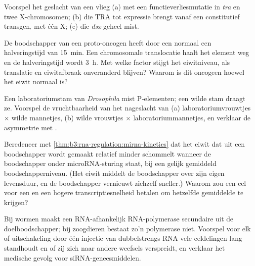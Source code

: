 \begin{exercise}[$\star\star$]\label{exo:b3:rna-regulation:7}
Voorspel het geslacht van een vlieg (a) met een functieverliesmutatie
in \emph{tra} en twee X-chromosomen; (b) die TRA tot expressie brengt
vanaf een constitutief transgen, met één X; (c) die \emph{dsx} geheel
mist.
\end{exercise}

\begin{exercise}[$\star\star$]\label{exo:b3:rna-regulation:8}
De boodschapper van een proto-oncogen heeft door een 
normaal een halveringstijd van \qty{15}{min}. Een chromosomale
translocatie haalt het element weg en de halveringstijd wordt
\qty{3}{h}. Met welke factor stijgt het eiwitniveau, als translatie en
eiwitafbraak onveranderd blijven? Waarom is dit oncogeen hoewel het
eiwit normaal is?
\end{exercise}

\begin{exercise}[$\star\star$]\label{exo:b3:rna-regulation:9}
Een laboratoriumstam van \emph{Drosophila} mist P-elementen; een wilde
stam draagt ze. Voorspel de vruchtbaarheid van het nageslacht van
(a) laboratoriumvrouwtjes $\times$ wilde mannetjes, (b) wilde
vrouwtjes $\times$ laboratoriummannetjes, en verklaar de asymmetrie
met .
\end{exercise}

\begin{exercise}[$\star\star\star$]\label{exo:b3:rna-regulation:10}
Beredeneer met \cref{thm:b3:rna-regulation:mirna-kinetics} dat het
eiwit dat uit een boodschapper wordt gemaakt relatief minder schommelt
wanneer de boodschapper onder microRNA-sturing staat, bij een gelijk
gemiddeld boodschapperniveau. (Het eiwit middelt de boodschapper over
zijn eigen levensduur, en de boodschapper vernieuwt zichzelf sneller.)
Waarom zou een cel voor een  en een hogere transcriptiesnelheid
betalen om hetzelfde gemiddelde te krijgen?
\end{exercise}

\begin{exercise}[$\star\star\star$]\label{exo:b3:rna-regulation:11}
Bij wormen maakt een RNA-afhankelijk RNA-polymerase secundaire 
uit de doelboodschapper; bij zoogdieren bestaat zo'n polymerase niet.
Voorspel voor elk of uitschakeling door één injectie van dubbelstrengs
RNA vele celdelingen lang standhoudt en of zij zich naar andere
weefsels verspreidt, en verklaar het medische gevolg voor
siRNA-geneesmiddelen.
\end{exercise}

